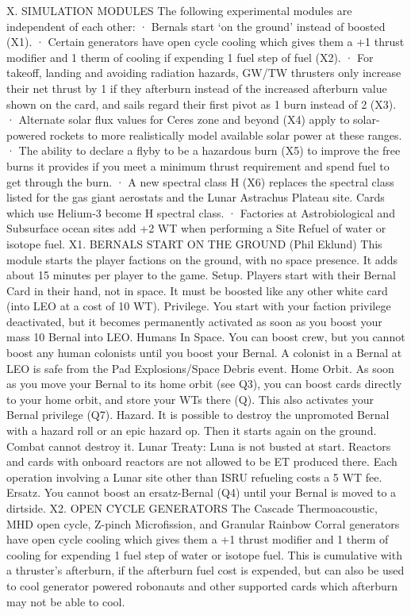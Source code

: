 \documentclass[a4paper]{book}
\begin{document}
X. SIMULATION MODULES
The following experimental modules are independent of each other:
·    Bernals start ‘on the ground’ instead of boosted (X1).
·       Certain generators have open cycle cooling which gives them a +1 thrust modifier and 1 therm of cooling if expending 1 fuel step of fuel (X2).
·       For takeoff, landing and avoiding radiation hazards, GW/TW thrusters only increase their net thrust by 1 if they afterburn instead of the increased afterburn value shown on the card, and sails regard their first pivot as 1 burn instead of 2 (X3).
·       Alternate solar flux values for Ceres zone and beyond (X4) apply to solar-powered rockets to more realistically model available solar power at these ranges.
·       The ability to declare a flyby to be a hazardous burn (X5) to improve the free burns it provides if you meet a minimum thrust requirement and spend fuel to get through the burn.
·       A new spectral class H (X6) replaces the spectral class listed for the gas giant aerostats and the Lunar Astrachus Plateau site. Cards which use Helium-3 become H spectral class.
·      Factories at Astrobiological and Subsurface ocean sites add +2 WT when performing a Site Refuel of water or isotope fuel.
X1. BERNALS START ON THE GROUND (Phil Eklund)
This module starts the player factions on the ground, with no space presence. It adds about 15 minutes per player to the game.
Setup. Players start with their Bernal Card in their hand, not in space. It must be boosted like any other white card (into LEO at a cost of 10 WT).
Privilege. You start with your faction privilege deactivated, but it becomes permanently activated as soon as you boost your mass 10 Bernal into LEO.
Humans In Space. You can boost crew, but you cannot boost any human colonists until you boost your Bernal. A colonist in a Bernal at LEO is safe from the Pad Explosions/Space Debris event.
Home Orbit. As soon as you move your Bernal to its home orbit (see Q3), you can boost cards directly to your home orbit, and store your WTs there (Q). This also activates your Bernal privilege (Q7).
Hazard. It is possible to destroy the unpromoted Bernal with a hazard roll or an epic hazard op. Then it starts again on the ground. Combat cannot destroy it.
Lunar Treaty: Luna is not busted at start. Reactors and cards with onboard reactors are not allowed to be ET produced there. Each operation involving a Lunar site other than ISRU refueling costs a 5 WT fee. 
Ersatz. You cannot boost an ersatz-Bernal (Q4) until your Bernal is moved to a dirtside.
X2. OPEN CYCLE GENERATORS
The Cascade Thermoacoustic, MHD open cycle, Z-pinch Microfission, and Granular Rainbow Corral generators have open cycle cooling which gives them a +1 thrust modifier and 1 therm of cooling for expending 1 fuel step of water or isotope fuel. This is cumulative with a thruster’s afterburn, if the afterburn fuel cost is expended, but can also be used to cool generator powered robonauts and other supported cards which afterburn may not be able to cool.
\end{document}
